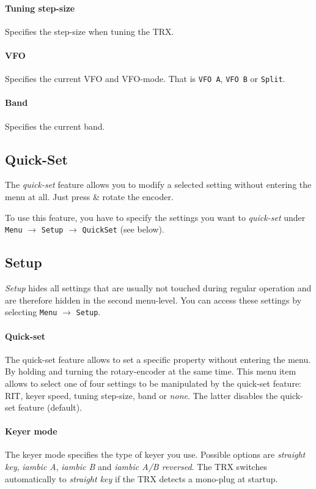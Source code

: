 \documentclass[10pt, a4paper,twoside]{scrartcl}
\begin{document}
\paragraph{Tuning step-size}
Specifies the step-size when tuning the TRX.

\paragraph{VFO}
Specifies the current VFO and VFO-mode. That is \texttt{VFO A}, \texttt{VFO B} or \texttt{Split}.

\paragraph{Band}
Specifies the current band. 


\subsection{Quick-Set}
The \emph{quick-set} feature allows you to modify a selected setting without entering the menu at all. Just press \& rotate the  encoder.

To use this feature, you have to specify the settings you want to \emph{quick-set} under \texttt{Menu} $\rightarrow$ \texttt{Setup} $\rightarrow$ \texttt{QuickSet} (see below).

\subsection{Setup}
\emph{Setup} hides all settings that are usually not touched during regular operation and are therefore hidden in the second menu-level. You can access these settings by selecting \texttt{Menu} $\rightarrow$ \texttt{Setup}.

\paragraph{Quick-set}
The quick-set feature allows to set a specific property without entering the menu. By holding and turning the rotary-encoder at the same time. This menu item allows to select one of four settings to be manipulated by the quick-set feature: RIT, keyer speed, tuning step-size, band or \emph{none}. The latter disables the quick-set feature (default).

\paragraph{Keyer mode}
The keyer mode specifies the type of keyer you use. Possible options are \emph{straight key}, \emph{iambic A}, \emph{iambic B} and \emph{iambic A/B reversed}. The TRX switches automatically to \emph{straight key} if the TRX detects a mono-plug at startup.
\end{document}
